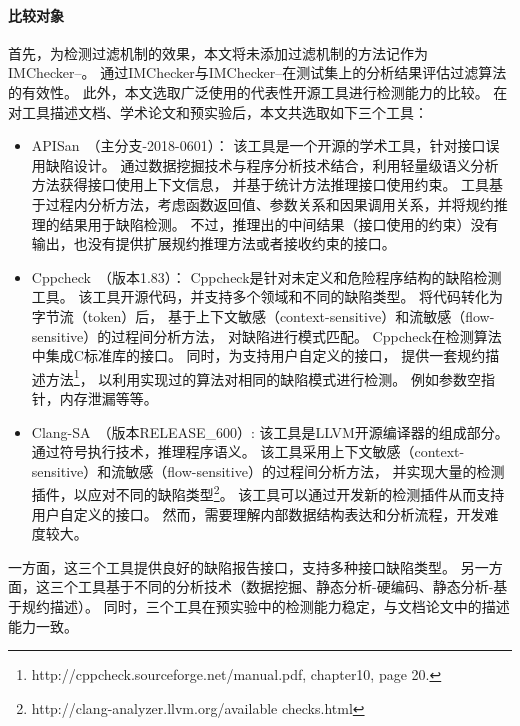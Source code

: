 \paragraph{ 比较对象}
首先，为检测过滤机制的效果，本文将未添加过滤机制的方法记作为IMChecker--。
通过IMChecker与IMChecker--在测试集上的分析结果评估过滤算法的有效性。
此外，本文选取广泛使用的代表性开源工具进行检测能力的比较。
在对工具描述文档、学术论文和预实验后，本文共选取如下三个工具：
\begin{itemize}
	\item APISan~\cite{16-sec-apisan}（主分支-2018-0601）：
	该工具是一个开源的学术工具，针对接口误用缺陷设计。
	通过数据挖掘技术与程序分析技术结合，利用轻量级语义分析方法获得接口使用上下文信息，
	并基于统计方法推理接口使用约束。
	工具基于过程内分析方法，考虑函数返回值、参数关系和因果调用关系，并将规约推理的结果用于缺陷检测。
	不过，推理出的中间结果（接口使用的约束）没有输出，也没有提供扩展规约推理方法或者接收约束的接口。
	\item Cppcheck~\cite{cppcheck}（版本1.83）：
	Cppcheck是针对未定义和危险程序结构的缺陷检测工具。
	该工具开源代码，并支持多个领域和不同的缺陷类型。
	将代码转化为字节流（token）后，
	基于上下文敏感（context-sensitive）和流敏感（flow-sensitive）的过程间分析方法，
	对缺陷进行模式匹配。
	Cppcheck在检测算法中集成C标准库的接口。
	同时，为支持用户自定义的接口，
	提供一套规约描述方法\footnote{http://cppcheck.sourceforge.net/manual.pdf, chapter10, page 20.}，
	以利用实现过的算法对相同的缺陷模式进行检测。
	例如参数空指针，内存泄漏等等。
	\item Clang-SA~\cite{clang-sa}（版本RELEASE\_600）:
	该工具是LLVM开源编译器的组成部分。
	通过符号执行技术，推理程序语义。
	该工具采用上下文敏感（context-sensitive）和流敏感（flow-sensitive）的过程间分析方法，
	并实现大量的检测插件，以应对不同的缺陷类型\footnote{http://clang-analyzer.llvm.org/available checks.html}。
	该工具可以通过开发新的检测插件从而支持用户自定义的接口。
	然而，需要理解内部数据结构表达和分析流程，开发难度较大。
\end{itemize} 
一方面，这三个工具提供良好的缺陷报告接口，支持多种接口缺陷类型。
另一方面，这三个工具基于不同的分析技术（数据挖掘、静态分析-硬编码、静态分析-基于规约描述）。
同时，三个工具在预实验中的检测能力稳定，与文档论文中的描述能力一致。

